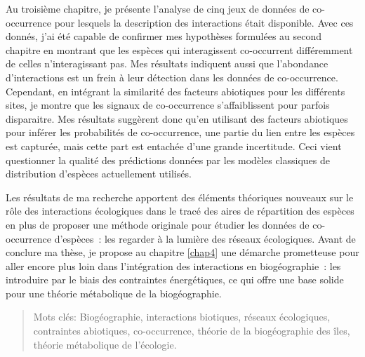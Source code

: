Au troisième chapitre, je présente l'analyse de cinq jeux de données de
co-occurrence pour lesquels la description des interactions était
disponible. Avec ces donnés, j'ai été capable de confirmer mes
hypothèses formulées au second chapitre en montrant que les espèces qui
interagissent co-occurrent différemment de celles n'interagissant pas.
Mes résultats indiquent aussi que l'abondance d'interactions est un
frein à leur détection dans les données de co-occurrence. Cependant, en
intégrant la similarité des facteurs abiotiques pour les différents
sites, je montre que les signaux de co-occurrence s'affaiblissent pour
parfois disparaitre. Mes résultats suggèrent donc qu'en utilisant des
facteurs abiotiques pour inférer les probabilités de co-occurrence, une
partie du lien entre les espèces est capturée, mais cette part est
entachée d'une grande incertitude. Ceci vient questionner la qualité des
prédictions données par les modèles classiques de distribution d'espèces
actuellement utilisés.

Les résultats de ma recherche apportent des éléments théoriques nouveaux
sur le rôle des interactions écologiques dans le tracé des aires de
répartition des espèces en plus de proposer une méthode originale pour
étudier les données de co-occurrence d'espèces~: les regarder à la
lumière des réseaux écologiques. Avant de conclure ma thèse, je propose
au chapitre \ref{chap4} une démarche prometteuse pour aller encore plus
loin dans l'intégration des interactions en biogéographie~: les
introduire par le biais des contraintes énergétiques, ce qui offre une
base solide pour une théorie métabolique de la biogéographie.

\begin{quote}
Mots clés: Biogéographie, interactions biotiques, réseaux écologiques,
contraintes abiotiques, co-occurrence, théorie de la biogéographie des
îles, théorie métabolique de l'écologie.
\end{quote}
